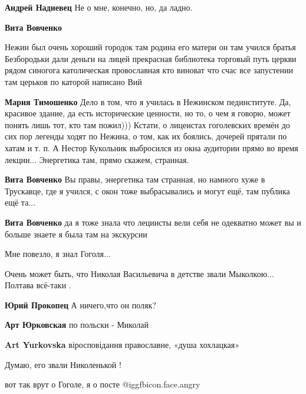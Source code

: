\begin{itemize}
\begin{itemize}
\begin{itemize}
\textbf{Андрей Надиевец} Не о мне, конечно, но, да ладно.

\end{itemize} %

\textbf{Вита Вовченко} 

Нежин был очень хороший городок там родина его матери он там учился братья
Безбородьки дали деньги на лицей прекрасная библиотека торговый путь церкви
рядом синогога католическая провославная кто виноват что счас все запустении
там церьков по каторой написано Вий

\begin{itemize} %
\textbf{Мария Тимошенко} Дело в том, что я училась в Нежинском пединституте. Да, красивое здание, да есть исторические ценности, но то, о чем я говорю, может понять лишь тот, кто там пожил))) Кстати, о лицеистах гоголевских времён до сих пор легенды ходят по Нежина, о том, как их боялись, дочерей прятали по хатам и т. п. А Нестор Кукольник выбросился из окна аудитории прямо во время лекции... Энергетика там, прямо скажем, странная.

\textbf{Вита Вовченко} Вы правы, энергетика там странная, но намного хуже в Трускавце, где я учился, с окон тоже выбрасывались и могут ещё, там публика ещё та...

\textbf{Вита Вовченко} да я тоже знала что лециисты вели себя не одекватно может вы и больше знаете я была там на экскурсии
\end{itemize} %

\end{itemize} %

Мне повезло, я знал Гоголя...

Очень может быть, что Николая Васильевича в детстве звали Мыколкою... Полтава всё-таки .

\begin{itemize} %
\textbf{Юрий Прокопец} А ничего,что он поляк?

\textbf{Арт Юрковская} по польски - Миколай

\textbf{Art Yurkovska} віросповідання православне, «душа хохлацкая»

Думаю, его звали Николенькой !
\end{itemize} %

вот так врут о Гоголе, я о посте @igg{fbicon.face.angry} 


\end{itemize}
